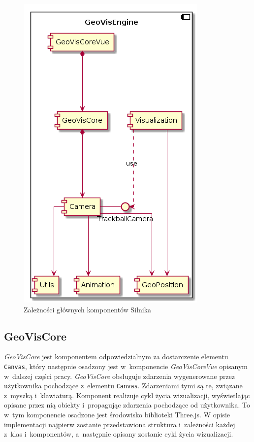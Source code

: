 \begin{figure}
    \centering 
    \includegraphics[scale=0.6]{diagrams/out/c3_geo_vis_engine.png}
    \caption{Zależności głównych komponentów Silnika}
    \label{fig:c3_geo_vis_engine}
\end{figure}

\subsection{GeoVisCore}

\textit{GeoVisCore} jest komponentem odpowiedzialnym za dostarczenie elementu \texttt{Canvas}, który następnie osadzony jest w~komponencie \textit{GeoVisCoreVue} opisanym w~dalszej części pracy. \textit{GeoVisCore} obsługuje zdarzenia wygenerowane przez użytkownika pochodzące z~elementu \texttt{Canvas}. Zdarzeniami tymi są te, związane z~myszką i~klawiaturą. Komponent realizuje cykl życia wizualizacji, wyświetlając opisane przez nią obiekty i~propagując zdarzenia pochodzące od użytkownika. To w~tym komponencie osadzone jest środowisko biblioteki Three.js.
W opisie implementacji najpierw zostanie przedstawiona struktura i~zależności każdej z~klas i~komponentów, a~następnie opisany zostanie cykl życia wizualizacji.

